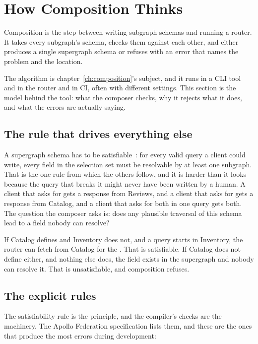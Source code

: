 \section{How Composition Thinks}
\label{sec:ch06-how-composition-thinks}
%

Composition is the step between writing subgraph schemas and running a router.
It takes every subgraph's schema, checks them against each other, and either
produces a single supergraph schema or refuses with an error that names the
problem and the location.

The algorithm is chapter~\ref{ch:composition}'s subject, and it runs in a CLI
tool and in the router and in CI, often with different settings. This section is
the model behind the tool: what the composer checks, why it rejects what it
does, and what the errors are actually saying.

\subsection*{The rule that drives everything else}

%
A supergraph schema has to be
satisfiable~\autocite{apollo2026compositionrules}: for every valid query a client could
write, every field in the selection set must be resolvable by at least one
subgraph. That is the one rule from which the others follow, and it is harder
than it looks because the query that breaks it might never have been written by
a human. A client that asks for  gets a response from
Reviews, and a client that asks for  gets a response from
Catalog, and a client that asks for both in one query gets both. The question
the composer asks is: does any plausible traversal of this schema lead to a
field nobody can resolve?

If Catalog defines  and Inventory does not, and a query
starts in Inventory, the router can fetch  from Catalog for the
. That is satisfiable. If Catalog does not define 
either, and nothing else does, the field exists in the supergraph and nobody can
resolve it. That is unsatisfiable, and composition refuses.

\subsection*{The explicit rules}

%
The satisfiability rule is the principle, and the compiler's checks are the
machinery. The Apollo Federation specification lists them, and these are the
ones that produce the most errors during development:


